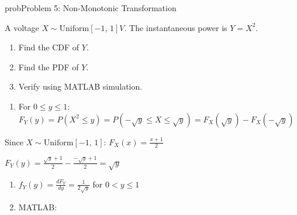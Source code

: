 \begin{PSbox}[unbreakable]{prob}{Problem 5: Non-Monotonic Transformation}

A voltage $X \sim \mathrm{Uniform}[-1,\, 1] V$. The instantaneous power is $Y = X^{2}$.

\begin{enumerate}
\def\labelenumi{(\alph{enumi})}
\tightlist
\item
  Find the CDF of $Y$.
\item
  Find the PDF of $Y$.
\item
  Verify using MATLAB simulation.
\end{enumerate}

\PSsolution{} 

\begin{enumerate}
\def\labelenumi{(\alph{enumi})}
\tightlist
\item
  For $0 \le y \le 1$:\PSbr{}$F_{Y}(y) = P(X^{2} \le y) = P\left(-\sqrt{y} \le X \le \sqrt{y}\right) = F_{X}\left(\sqrt{y}\right) - F_{X}\left(-\sqrt{y}\right)$
\end{enumerate}

Since $X \sim \mathrm{Uniform}[-1,\,1]$: $F_{X}(x) = \frac{x+1}{2}$

$\displaystyle F_{Y}(y) = \frac{\sqrt{y} + 1}{2} - \frac{-\sqrt{y} + 1}{2} = \sqrt{y}$

\begin{enumerate}
\def\labelenumi{(\alph{enumi})}
\setcounter{enumi}{1}
\item
  $f_{Y}(y) = \frac{dF_{Y}}{dy} = \frac{1}{2\sqrt{y}}$ for $0 < y \le 1$
\item
  MATLAB:
\end{enumerate}



\end{PSbox}
